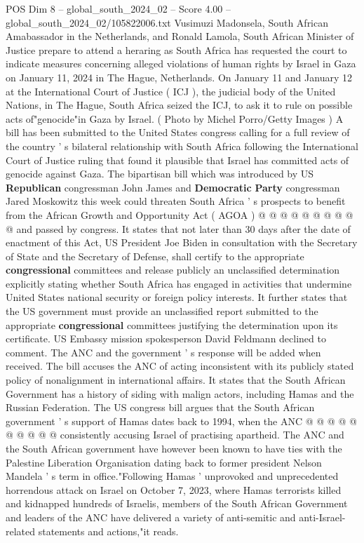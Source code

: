 \begin{textsample}{POS Dim 8 – global\_south\_2024\_02 – Score 4.00 – global\_south\_2024\_02/105822006.txt}  \label{ex:f8_pos_208}
Vusimuzi Madonsela, South African Amabassador in the Netherlands, and Ronald Lamola, South African Minister of Justice prepare to attend a heraring as South Africa has requested the court to indicate measures concerning alleged violations of human rights by Israel in Gaza on January 11, 2024 in The Hague, Netherlands.
On January 11 and January 12 at the International Court of Justice ( ICJ ), the judicial body of the United Nations, in The Hague, South Africa seized the ICJ, to ask it to rule on possible acts of"genocide"in Gaza by Israel. ( Photo by Michel Porro/Getty Images ) A bill has been submitted to the United States congress calling for a full review of the country ' s bilateral relationship with South Africa following the International Court of Justice ruling that found it plausible that Israel has committed acts of genocide against Gaza.
The bipartisan bill which was introduced by US \textbf{Republican} congressman John James and \textbf{Democratic} \textbf{Party} congressman Jared Moskowitz this week could threaten South Africa ' s prospects to benefit from the African Growth and Opportunity Act ( AGOA ) @ @ @ @ @ @ @ @ @ @ and passed by congress.
It states that not later than 30 days after the date of enactment of this Act, US President Joe Biden in consultation with the Secretary of State and the Secretary of Defense, shall certify to the appropriate \textbf{congressional} committees and release publicly an unclassified determination explicitly stating whether South Africa has engaged in activities that undermine United States national security or foreign policy interests.
It further states that the US government must provide an unclassified report submitted to the appropriate \textbf{congressional} committees justifying the determination upon its certificate.
US Embassy mission spokesperson David Feldmann declined to comment.
The ANC and the government ' s response will be added when received.
The bill accuses the ANC of acting inconsistent with its publicly stated policy of nonalignment in international affairs.
It states that the South African Government has a history of siding with malign actors, including Hamas and the Russian Federation.
The US congress bill argues that the South African government ' s support of Hamas dates back to 1994, when the ANC @ @ @ @ @ @ @ @ @ @ consistently accusing Israel of practising apartheid.
The ANC and the South African government have however been known to have ties with the Palestine Liberation Organisation dating back to former president Nelson Mandela ' s term in office."Following Hamas ' unprovoked and unprecedented horrendous attack on Israel on October 7, 2023, where Hamas terrorists killed and kidnapped hundreds of Israelis, members of the South African Government and leaders of the ANC have delivered a variety of anti-semitic and anti-Israel-related statements and actions,"it reads.

\end{textsample}
